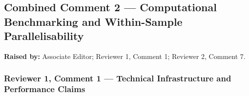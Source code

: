 \documentclass[
  11pt,
  a4paper,
]{article}
\begin{document}
\subsection{Combined Comment 2 --- Computational Benchmarking and
Within-Sample
Parallelisability}\label{combined-comment-2--computational-benchmarking-and-within-sample-parallelisability}

\textbf{Raised by:} Associate Editor; Reviewer 1, Comment 1; Reviewer 2,
Comment 7.

\subsubsection{Reviewer 1, Comment 1 --- Technical Infrastructure and
Performance
Claims}\label{reviewer-1-comment-1--technical-infrastructure-and-performance-claims}
\end{document}
